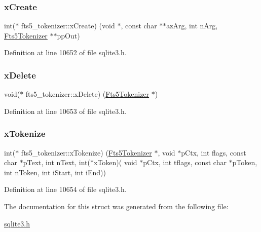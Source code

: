 \subsubsection{\texorpdfstring{x\+Create}{xCreate}}
{\footnotesize\ttfamily int($\ast$ fts5\+\_\+tokenizer\+::x\+Create) (void $\ast$, const char $\ast$$\ast$az\+Arg, int n\+Arg, \mbox{\hyperlink{sqlite3_8h_ac015f88c5332d612a3125fc0014e468c}{Fts5\+Tokenizer}} $\ast$$\ast$pp\+Out)}



Definition at line 10652 of file sqlite3.\+h.

\mbox{\label{structfts5__tokenizer_aaaa88b9f3e50f0b1120a05fb1bbb251f}} 
\subsubsection{\texorpdfstring{x\+Delete}{xDelete}}
{\footnotesize\ttfamily void($\ast$ fts5\+\_\+tokenizer\+::x\+Delete) (\mbox{\hyperlink{sqlite3_8h_ac015f88c5332d612a3125fc0014e468c}{Fts5\+Tokenizer}} $\ast$)}



Definition at line 10653 of file sqlite3.\+h.

\mbox{\label{structfts5__tokenizer_ae65ca5a9b1e6d5c1ef09731fccefa577}} 
\subsubsection{\texorpdfstring{x\+Tokenize}{xTokenize}}
{\footnotesize\ttfamily int($\ast$ fts5\+\_\+tokenizer\+::x\+Tokenize) (\mbox{\hyperlink{sqlite3_8h_ac015f88c5332d612a3125fc0014e468c}{Fts5\+Tokenizer}} $\ast$, void $\ast$p\+Ctx, int flags, const char $\ast$p\+Text, int n\+Text, int($\ast$x\+Token)( void $\ast$p\+Ctx, int tflags, const char $\ast$p\+Token, int n\+Token, int i\+Start, int i\+End))}



Definition at line 10654 of file sqlite3.\+h.



The documentation for this struct was generated from the following file\+:\begin{DoxyCompactItemize}
\item 
\mbox{\hyperlink{sqlite3_8h}{sqlite3.\+h}}\end{DoxyCompactItemize}
